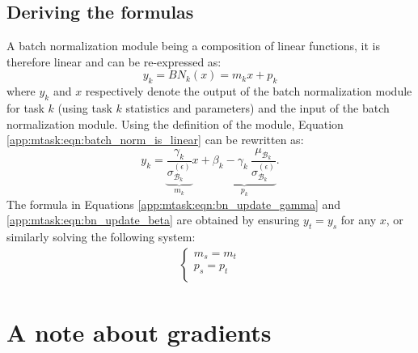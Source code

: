 \subsection*{Deriving the formulas}
A batch normalization module being a composition of linear functions, it is therefore linear and can be re-expressed as:
\begin{equation} \label{app:mtask:eqn:batch_norm_is_linear}
y_k = BN_k(x) = m_k x + p_k
\end{equation}
where $y_k$ and $x$ respectively denote the output of the batch normalization module for task $k$ (\ie using task $k$ statistics and parameters) and the input of the batch normalization module. Using the definition of the module, Equation \ref{app:mtask:eqn:batch_norm_is_linear} can be rewritten as:
\begin{equation} \label{app:mtask:eqn:batch_norm_is_linear_rewritten}
y_k = \underbrace{\dfrac{\gamma_k}{\sigma^{(\epsilon)}_{\mathcal{B}_k}}}_{m_k} x + \underbrace{\beta_k - \gamma_k\ \dfrac{\mu_{\mathcal{B}_k}}{\sigma^{(\epsilon)}_{\mathcal{B}_k}}}_{p_k}.
\end{equation}
The formula in Equations \ref{app:mtask:eqn:bn_update_gamma} and \ref{app:mtask:eqn:bn_update_beta} are obtained by ensuring $y_t = y_s$ for any $x$, or similarly solving the following system:
\begin{align}
\begin{cases}
m_s = m_t\\
p_s = p_t\\
\end{cases}
\end{align}

\section{A note about gradients}
\label{app:mtask:sec:gradients}

